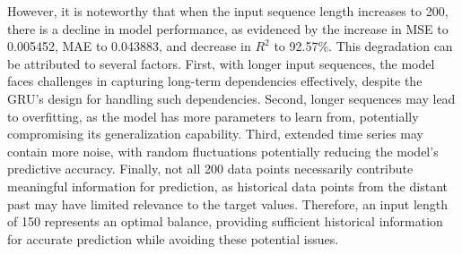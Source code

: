 \documentclass[sn-mathphys-num]{sn-jnl}%
\begin{document}
However, it is noteworthy that when the input sequence length increases to 200, there is a decline in model performance, as evidenced by the increase in MSE to 0.005452, MAE to 0.043883, and decrease in $R^2$ to 92.57\%. This degradation can be attributed to several factors. First, with longer input sequences, the model faces challenges in capturing long-term dependencies effectively, despite the GRU's design for handling such dependencies. Second, longer sequences may lead to overfitting, as the model has more parameters to learn from, potentially compromising its generalization capability. Third, extended time series may contain more noise, with random fluctuations potentially reducing the model's predictive accuracy. Finally, not all 200 data points necessarily contribute meaningful information for prediction, as historical data points from the distant past may have limited relevance to the target values. Therefore, an input length of 150 represents an optimal balance, providing sufficient historical information for accurate prediction while avoiding these potential issues.

\begin{table}[ht!]
    \centering
    \caption{TCN-GRU Model Architecture}
    \label{TCN-GRU}
\end{table}
\end{document}
